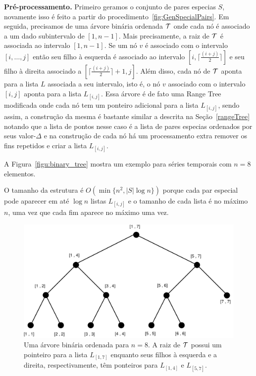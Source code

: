 \documentclass[12pt]{article}
\begin{document}
\textbf{Pré-processamento.} Primeiro geramos o conjunto de pares especias $S$, novamente
isso é feito a partir do procedimento~\ref{fig:GenSpecialPairs}. Em seguida, precisamos 
de uma árvore binária ordenada ${\cal T}$ onde cada nó é associado a um dado subintervalo de $[1, n - 1]$. 
Mais precisamente, a raiz de ${\cal T}$ é associada ao intervalo $[1, n - 1]$. Se um nó $v$ é associado com o intervalo 
$[i, \ldots, j]$ então seu filho à esquerda é associado ao intervalo $[i, \lceil \frac{(i + j)}{2} \rceil]$ e seu filho à direita associado
a $[\lceil \frac{(i + j)}{2} \rceil  + 1, j]$. Além disso, cada nó de ${\cal T}$ aponta para a lista $L$ associada a seu intervalo,
 isto é, o nó $v$ associado com o intervalo $[i, j]$ aponta para a lista $L_{[i, j]}$. Essa árvore é de fato uma
 Range Tree modificada onde cada nó tem um ponteiro adicional para a lista $L_{[i, j]}$, sendo assim, a construção
 da mesma é bastante similar a descrita na Seção~\ref{rangeTree} notando que a lista de pontos nesse caso é 
 a lista de pares especias ordenados por seus valor-$\Delta$ e na construção de cada nó há um processamento extra remover
 os fins repetidos e criar a lista $L_{[i, j]}$.

 A Figura~\ref{figu:binary_tree} mostra um exemplo para séries temporais com $n = 8$ elementos. 
 
O tamanho da estrutura é $O(\min\{n^2, |S|\log n\})$ porque cada par especial pode aparecer em até $\log n$ listas $L_{[i, j]}$ e o tamanho de cada lista
é no máximo $n$, uma vez que cada fim aparece no máximo uma vez.

\begin{figure}[htp]
\begin{center}
\includegraphics[scale=0.2]{arvore.pdf}
\caption{Uma árvore binária ordenada para $n = 8$. A raiz de ${\cal T}$ possui um pointeiro para a lista $L_{[1,7]}$ enquanto seus filhos à esquerda 
e a direita, respectivamente, têm ponteiros para $L_{[1,4]}$ e $L_{[5,7]}$. }
\label{fig:binary_tree}
\end{center}
\end{figure}
\end{document}
